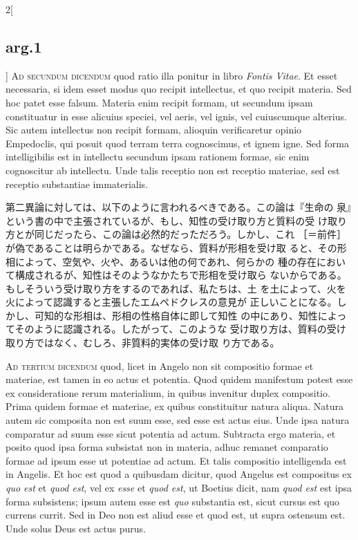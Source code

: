 \documentclass[paper=a4paper,fontsize=10pt,jafontsize=9pt,titlepage]{jlreq}
\begin{document}
\begin{paracol}{2}[\subsection{arg.1}]
{\scshape Ad secundum dicendum} quod ratio illa ponitur in libro
{\itshape Fontis Vitae}. Et esset necessaria, si idem esset modus quo
recipit intellectus, et quo recipit materia. Sed hoc patet esse
falsum. Materia enim recipit formam, ut secundum ipsam constituatur in
esse alicuius speciei, vel aeris, vel ignis, vel cuiuscumque
alterius. Sic autem intellectus non recipit formam, alioquin
verificaretur opinio Empedoclis, qui posuit quod terram terra
cognoscimus, et ignem igne. Sed forma intelligibilis est in intellectu
secundum ipsam rationem formae, sic enim cognoscitur ab
intellectu. Unde talis receptio non est receptio materiae, sed est
receptio substantiae immaterialis.

\switchcolumn

第二異論に対しては、以下のように言われるべきである。この論は『生命の
 泉』という書の中で主張されているが、もし、知性の受け取り方と質料の受
 け取り方とが同じだったら、この論は必然的だっただろう。しかし、これ
 ［＝前件］が偽であることは明らかである。なぜなら、質料が形相を受け取
 ると、その形相によって、空気や、火や、あるいは他の何であれ、何らかの
 種の存在において構成されるが、知性はそのようなかたちで形相を受け取ら
 ないからである。もしそういう受け取り方をするのであれば、私たちは、土
 を土によって、火を火によって認識すると主張したエムペドクレスの意見が
 正しいことになる。しかし、可知的な形相は、形相の性格自体に即して知性
 の中にあり、知性によってそのように認識される。したがって、このような
 受け取り方は、質料の受け取り方ではなく、むしろ、非質料的実体の受け取
 り方である。

\switchcolumn*[\subsection{ad.3}]

{\scshape Ad tertium dicendum} quod, licet in Angelo non sit
compositio formae et materiae, est tamen in eo actus et potentia. Quod
quidem manifestum potest esse ex consideratione rerum materialium, in
quibus invenitur duplex compositio. Prima quidem formae et materiae,
ex quibus constituitur natura aliqua. Natura autem sic composita non
est suum esse, sed esse est actus eius. Unde ipsa natura comparatur ad
suum esse sicut potentia ad actum. Subtracta ergo materia, et posito
quod ipsa forma subsistat non in materia, adhuc remanet comparatio
formae ad ipsum esse ut potentiae ad actum. Et talis compositio
intelligenda est in Angelis. Et hoc est quod a quibusdam dicitur, quod
Angelus est compositus ex {\itshape quo est} et {\itshape quod est},
vel ex {\itshape esse} et {\itshape quod est}, ut Boetius dicit, nam
{\itshape quod est} est ipsa forma subsistens; ipsum autem esse est
{\itshape quo} substantia est, sicut cursus est quo currens
currit. Sed in Deo non est aliud esse et quod est, ut supra ostensum
est. Unde solus Deus est actus purus.


\end{paracol}
\end{document}
